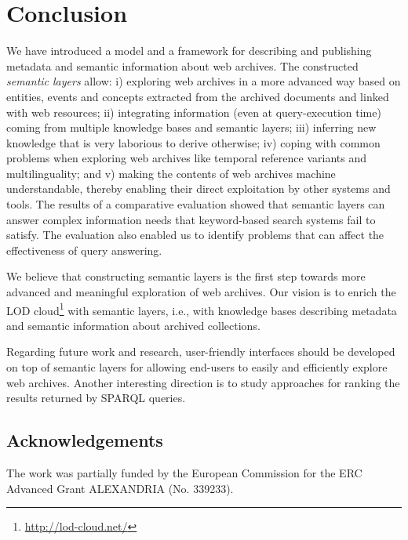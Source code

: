 \documentclass{libtex/sig-alternate-05-2015}
\begin{document}
\section{Conclusion}
\label{sec:concl}

We have introduced a model and a framework
for describing and publishing metadata and
semantic information about web archives.
The constructed {\em semantic layers} allow:
i) exploring web archives in a more advanced way
based on entities, events and concepts extracted
from the archived documents and linked with web resources;
ii) integrating information (even at query-execution time)
coming from multiple knowledge bases and semantic layers;
iii) inferring new knowledge that is very laborious to derive otherwise;
iv) coping with common problems when exploring web archives like
temporal reference variants and multilinguality; and
v) making the contents of web archives machine understandable,
thereby enabling their direct exploitation by other systems and tools.
The results of a comparative evaluation showed that semantic layers
can answer complex information needs that keyword-based search systems
fail to satisfy. The evaluation also enabled us to identify problems that can
affect the effectiveness of query answering.

We believe that constructing semantic layers is
the first step towards more advanced and meaningful
exploration of web archives.
Our vision is to enrich the LOD cloud\footnote{\url{http://lod-cloud.net/}}
with semantic layers, i.e., with knowledge bases describing metadata
and semantic information about archived collections.

Regarding future work and research,
user-friendly interfaces should be
developed on top of semantic layers for allowing
end-users to easily and efficiently explore web archives.
Another interesting direction is to study approaches
for ranking the results returned by SPARQL queries.


\subsection*{Acknowledgements}
\vspace{-1mm}
The work was partially funded by the
European Commission for the ERC Advanced Grant ALEXANDRIA (No. 339233).


\fontsize{8.5pt}{9pt}\selectfont



\end{document}
